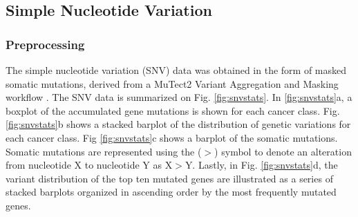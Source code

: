 \subsection{Simple Nucleotide Variation}

\subsubsection{Preprocessing}

The simple nucleotide variation (SNV) data was obtained in the form of masked somatic mutations, derived from a MuTect2 Variant Aggregation and Masking workflow \cite{cibulskis2013sensitive}. The SNV data is summarized on Fig. \ref{fig:snvstats}. In \ref{fig:snvstats}a, a boxplot of the accumulated gene mutations is shown for each cancer class. Fig. \ref{fig:snvstats}b shows a stacked barplot of the distribution of genetic variations for each cancer class. Fig \ref{fig:snvstats}c shows a barplot of the somatic mutations. Somatic mutations are represented using the ($>$) symbol to denote an alteration from nucleotide X to nucleotide Y as X$>$Y. Lastly, in Fig. \ref{fig:snvstats}d, the variant distribution of the top ten mutated genes are illustrated as a series of stacked barplots organized in ascending order by the most frequently mutated genes. 

